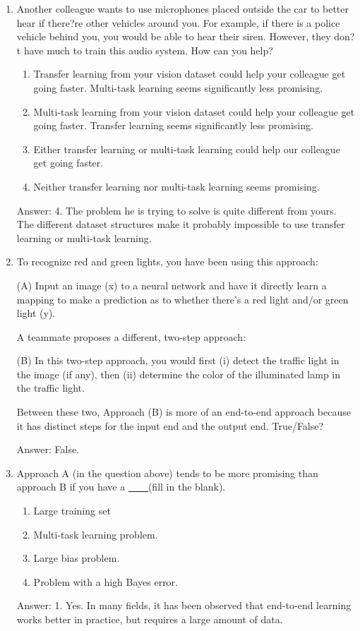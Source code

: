 \documentclass[12pt]{article}
\numberwithin{equation}{section}
\begin{document}
\begin{enumerate}
	\item Another colleague wants to use microphones placed outside the car to better hear if there?re other vehicles around you. For example, if there is a police vehicle behind you, you would be able to hear their siren. However, they don?t have much to train this audio system. How can you help?
	\begin{enumerate}
		\item Transfer learning from your vision dataset could help your colleague get going faster. Multi-task learning seems significantly less promising.
		\item Multi-task learning from your vision dataset could help your colleague get going faster. Transfer learning seems significantly less promising.
		\item Either transfer learning or multi-task learning could help our colleague get going faster.
		\item Neither transfer learning nor multi-task learning seems promising.
	\end{enumerate}
	Answer: 4. The problem he is trying to solve is quite different from yours. The different dataset structures make it probably impossible to use transfer learning or multi-task learning.
	\item To recognize red and green lights, you have been using this approach: \par
	(A) Input an image (x) to a neural network and have it directly learn a mapping to make a prediction as to whether there's a red light and/or green light (y). \par
A teammate proposes a different, two-step approach:\par
	(B) In this two-step approach, you would first (i) detect the traffic light in the image (if any), then (ii) determine the color of the illuminated lamp in the traffic light.\par
	Between these two, Approach (B) is more of an end-to-end approach because it has distinct steps for the input end and the output end. True/False? \par
	Answer: False.
	\item Approach A (in the question above) tends to be more promising than approach B if you have a \underline{    \  \  \  \  }(fill in the blank).
	\begin{enumerate}
		\item Large training set
		\item Multi-task learning problem.
		\item Large bias problem.
		\item Problem with a high Bayes error.
	\end{enumerate}
	Answer: 1. Yes. In many fields, it has been observed that end-to-end learning works better in practice, but requires a large amount of data.
\end{enumerate}
\end{document}
